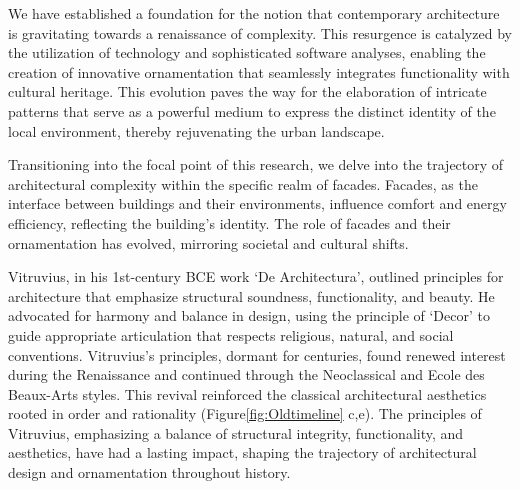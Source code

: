 


We have established a foundation for the notion that contemporary architecture is gravitating towards a renaissance of complexity.
This resurgence is catalyzed by the utilization of technology and sophisticated software analyses, enabling the creation of innovative ornamentation that seamlessly integrates functionality with cultural heritage.
This evolution paves the way for the elaboration of intricate patterns that serve as a powerful medium to express the distinct identity of the local environment, thereby rejuvenating the urban landscape.

Transitioning into the focal point of this research, we delve into the trajectory of architectural complexity within the specific realm of facades.
Facades, as the interface between buildings and their environments, influence comfort and energy efficiency, reflecting the building's identity\cite{Kamal2020}.
The role of facades and their ornamentation has evolved, mirroring societal and cultural shifts.


Vitruvius, in his 1st-century BCE work `De Architectura', outlined principles for architecture that emphasize structural soundness, functionality, and beauty\cite{Ostwald2023}.
He advocated for harmony and balance in design, using the principle of `Decor' to guide appropriate articulation that respects religious, natural, and social conventions\cite{Lefas2000}.
Vitruvius's principles, dormant for centuries, found renewed interest during the Renaissance and continued through the Neoclassical and Ecole des Beaux-Arts styles\cite{Wikipedia2023}.
This revival reinforced the classical architectural aesthetics rooted in order and rationality (Figure\ref{fig:Oldtimeline} c,e).
The principles of Vitruvius, emphasizing a balance of structural integrity, functionality, and aesthetics, have had a lasting impact, shaping the trajectory of architectural design and ornamentation throughout history.


